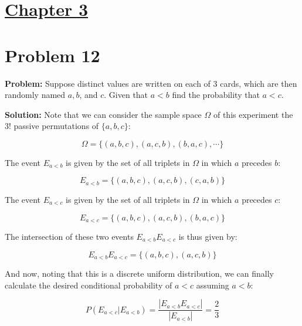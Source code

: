 \documentclass{article}
\begin{document}
\section*{\underline{Chapter 3}}

\section*{Problem 12}
\noindent\textbf{Problem:} Suppose distinct values are written on each of 3 cards, which are then randomly named $a,b$, and $c$. Given that $a< b$ find the probability that $a<c$. 
\bigskip

\noindent\textbf{Solution:} Note that we can consider the sample space $\Omega$ of this experiment the $3!$ passive permutations of $\{a,b,c\}$:

\begin{equation*}
    \Omega=\{(a,b,c),(a,c,b),(b,a,c),\cdots\}
\end{equation*}

The event $E_{a<b}$ is given by the set of all triplets in $\Omega$ in which $a$ precedes $b$:

\begin{equation*}
    E_{a< b}=\{(a,b,c),(a,c,b),(c,a,b)\}
\end{equation*}

The event $E_{a< c}$ is given by the set of all triplets in $\Omega$ in which $a$ precedes $c$:

\begin{equation*}
    E_{a< c}=\{(a,b,c),(a,c,b),(b,a,c)\}
\end{equation*}

The intersection of these two events $E_{a<b}E_{a<c}$ is thus given by:

\begin{equation*}
    E_{a<b}E_{a< c}=\{(a,b,c),(a,c,b)\}
\end{equation*}

And now, noting that this is a discrete uniform distribution, we can finally calculate the desired conditional probability of $a<c$ assuming $a<b$:


\begin{equation*}
    P(E_{a<c}| E_{a<b})=\frac{|E_{a<b}E_{a< c}|}{|E_{a<b}|}=\frac{2}{3}
\end{equation*}
\end{document}
